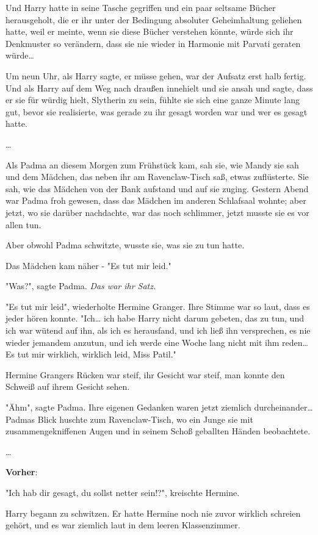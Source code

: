 {Und Harry hatte in seine Tasche gegriffen und ein paar seltsame Bücher herausgeholt, die er ihr unter der Bedingung absoluter Geheimhaltung geliehen hatte, weil er meinte, wenn sie diese Bücher verstehen könnte, würde sich ihr Denkmuster so verändern, dass sie nie wieder in Harmonie mit Parvati geraten würde…

Um neun Uhr, als Harry sagte, er müsse gehen, war der Aufsatz erst halb fertig. Und als Harry auf dem Weg nach draußen innehielt und sie ansah und sagte, dass er sie für würdig hielt, Slytherin zu sein, fühlte sie sich eine ganze Minute lang gut, bevor sie realisierte, was gerade zu ihr gesagt worden war und wer es gesagt hatte.

…

Als Padma an diesem Morgen zum Frühstück kam, sah sie, wie Mandy sie sah und dem Mädchen, das neben ihr am Ravenclaw-Tisch saß, etwas zuflüsterte. Sie sah, wie das Mädchen von der Bank aufstand und auf sie zuging. Gestern Abend war Padma froh gewesen, dass das Mädchen im anderen Schlafsaal wohnte; aber jetzt, wo sie darüber nachdachte, war das noch schlimmer, jetzt musste sie es vor allen tun.

Aber obwohl Padma schwitzte, wusste sie, was sie zu tun hatte.

Das Mädchen kam näher - "Es tut mir leid."

"Was?", sagte Padma. \emph{Das war ihr Satz.}

"Es tut mir leid", wiederholte Hermine Granger. Ihre Stimme war so laut, dass es jeder hören konnte. "Ich… ich habe Harry nicht darum gebeten, das zu tun, und ich war wütend auf ihn, als ich es herausfand, und ich ließ ihn versprechen, es nie wieder jemandem anzutun, und ich werde eine Woche lang nicht mit ihm reden… Es tut mir wirklich, wirklich leid, Miss Patil."

Hermine Grangers Rücken war steif, ihr Gesicht war steif, man konnte den Schweiß auf ihrem Gesicht sehen.

"Ähm", sagte Padma. Ihre eigenen Gedanken waren jetzt ziemlich durcheinander… Padmas Blick huschte zum Ravenclaw-Tisch, wo ein Junge sie mit zusammengekniffenen Augen und in seinem Schoß geballten Händen beobachtete.

…

\textbf{Vorher}:

"Ich hab dir gesagt, du sollst netter sein!?", kreischte Hermine.

Harry begann zu schwitzen. Er hatte Hermine noch nie zuvor wirklich schreien gehört, und es war ziemlich laut in dem leeren Klassenzimmer.

}
